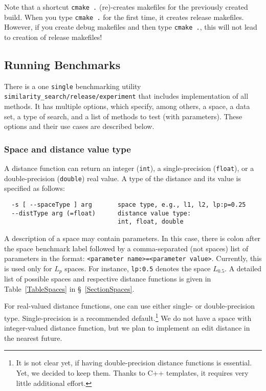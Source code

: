 \documentclass[runningheads,a4paper]{llncs}
\newcommand{\ttt}[1]{\texttt{#1}}
\begin{document}
{Note that a shortcut \ttt{cmake .} (re)-creates makefiles for the previously 
created build. When you type \ttt{cmake .} for the first time,
it creates release makefiles. However, if you create debug
makefiles and then type \ttt{cmake .}, 
this will not lead to creation of release makefiles! 

\subsection{Running Benchmarks}\label{SectionRunBenchmark}
There is a one \ttt{single} benchmarking utility \ttt{similarity\_search/release/experiment} 
that includes implementation of all methods.
It has multiple options, which specify, among others, 
a space, a data set, a type of search, and a list of methods to test (with parameters).
These options and their use cases are described below.

\subsubsection{Space and distance value type}

A distance function can return an integer (\ttt{int}), a single-precision (\ttt{float}),
or a double-precision (\ttt{double}) real value.
A type of the distance and its value is specified as follows:

\begin{verbatim}
  -s [ --spaceType ] arg       space type, e.g., l1, l2, lp:p=0.25
  --distType arg (=float)      distance value type: 
                               int, float, double
\end{verbatim}

A description of a space may contain parameters.
In this case, there is colon after the space benchmark label followed by a
comma-separated (not spaces) list of parameters in the format:
\ttt{<parameter name>=<parameter value>}.
Currently, this is used only for $L_p$ spaces. For instance,
 \ttt{lp:0.5} denotes the space $L_{0.5}$.
A detailed list of possible spaces and respective
distance functions is given in Table~\ref{TableSpaces} in \S~\ref{SectionSpaces}.

For real-valued distance functions, one can use either single- or double-precision
type. Single-precision is a recommended default.\footnote{It is not clear yet,
if having double-precision distance functions is essential. Yet, we decided
to keep them. Thanks to C++ templates, it requires very little additional effort.}
We do not have a space with integer-valued distance function, but we
plan to implement an edit distance in the nearest future.

}
\end{document}
